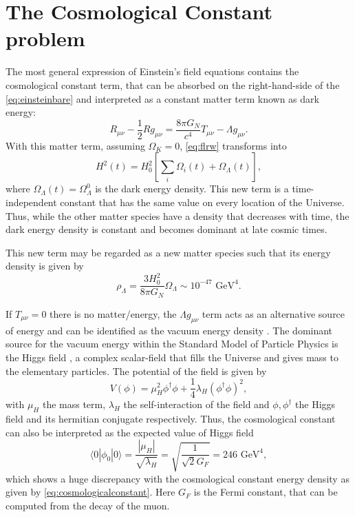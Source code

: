 \section{The Cosmological Constant problem}
The most general expression of Einstein's field equations contains the cosmological constant term, that can be absorbed on the right-hand-side of the \autoref{eq:einsteinbare} and interpreted as a constant matter term known as dark energy:
\begin{equation}
R_{\mu\nu}-\frac{1}{2}Rg_{\mu\nu} = \frac{8\pi G_N}{c^4}T_{\mu\nu}-\Lambda g_{\mu\nu}.
\end{equation}
With this matter term, assuming $\Omega_K=0$, \autoref{eq:flrw} transforms into
\begin{equation}
H^2(t) = H_0^2\left[\sum_i\Omega_i(t) +\Omega_\Lambda(t)\right],
\end{equation}
where $\Omega_\Lambda(t)=\Omega_\Lambda^0$ is the dark energy density. This new term is a time-independent constant that has the same value on every location of the Universe. Thus, while the other matter species have a density that decreases with time, the dark energy density is constant and becomes dominant at late cosmic times.
\newline

This new term may be regarded as a new matter species such that its energy density is given by
\begin{equation}
\rho_\Lambda = \frac{3H_0^2}{8\pi G_N}\Omega_\Lambda\sim 10 ^{-47} \mbox{ GeV}^4.
\label{eq:cosmologicalconstant}
\end{equation}
\newline

If $T_{\mu\nu}=0$ there is no matter/energy, the $\Lambda g_{\mu\nu}$ term acts as an alternative source of energy and can be identified as the vacuum energy density \cite{0038-5670-11-3-A13,RevModPhys.61.1,2003PhR...380..235P,PhysRevD.72.021301}. The dominant source for the vacuum energy within the Standard Model of Particle Physics is the Higgs field \cite{1974JETPL..19..183L,PhysRevLett.34.777}, a complex scalar-field that fills the Universe and gives mass to the elementary particles. The potential of the field is given by
\begin{equation}
V(\phi) = \mu_H^2\phi^\dagger\phi+\frac{1}{4}\lambda_H(\phi^\dagger\phi)^2,
\end{equation}
with $\mu_H$ the mass term, $\lambda_H$ the self-interaction of the field and $\phi,\phi^\dagger$ the Higgs field and its hermitian conjugate respectively. Thus, the cosmological constant can also be interpreted as the expected value of Higgs field \cite{1974JETPL..19..183L,PhysRevLett.34.777}
\begin{equation}
\langle 0|\phi_0|0\rangle = \frac{|\mu_H|}{\sqrt{\lambda_H}}= \sqrt{\frac{1}{\sqrt{2}G_F}}= 246\mbox{ GeV}^4,
\end{equation}
which shows a huge discrepancy with the cosmological constant energy density as given by \autoref{eq:cosmologicalconstant}. Here $G_F$ is the Fermi constant, that can be computed from the decay of the muon.

